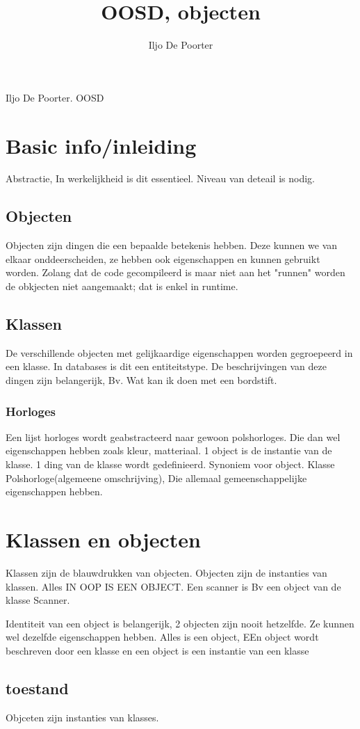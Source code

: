 \documentclass{article}
\renewcommand{\maketitle}{
\begin{center}
{\huge\bfseries
\theauthor}

\vspace{.25em}
Iljo De Poorter. OOSD
\end{center}
}
\begin{document}
\title{OOSD, objecten}
\author{Iljo De Poorter}
\maketitle
\section{Basic info/inleiding}
Abstractie, In werkelijkheid is dit essentieel. 
Niveau van deteail is nodig.
\subsection{Objecten}
Objecten zijn dingen die een bepaalde betekenis hebben.
Deze kunnen we van elkaar onddeerscheiden, ze hebben ook eigenschappen en kunnen gebruikt worden.
Zolang dat de code gecompileerd is maar niet aan het "runnen" worden de obkjecten niet aangemaakt; dat is enkel in runtime.
\subsection{Klassen}
De verschillende objecten met gelijkaardige eigenschappen worden gegroepeerd in een klasse. In databases is dit een entiteitstype.
De beschrijvingen van deze dingen zijn belangerijk, Bv. Wat kan ik doen met een bordstift.
\subsubsection{Horloges}
Een lijst horloges wordt geabstracteerd naar gewoon polshorloges. Die dan wel eigenschappen hebben zoals kleur, matteriaal.
1 object is de instantie van de klasse. 1 ding van de klasse wordt gedefinieerd. Synoniem voor object. Klasse Polshorloge(algemeene omschrijving), Die allemaal gemeenschappelijke eigenschappen hebben.

\section{Klassen en objecten}
Klassen zijn de blauwdrukken van objecten. Objecten zijn de instanties van klassen.
Alles IN OOP IS EEN OBJECT. Een scanner is Bv een object van de klasse Scanner.

Identiteit van een object is belangerijk, 2 objecten zijn nooit hetzelfde. Ze kunnen wel dezelfde eigenschappen hebben.
Alles is een object, EEn object wordt beschreven door een klasse en een object is een instantie van een klasse

\subsection{toestand}
Objceten zijn instanties van klasses.
\end{document}
